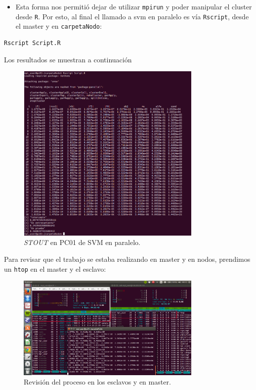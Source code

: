 \documentclass[]{article}
\begin{document}
\begin{itemize}
\itemsep1pt\parskip0pt
\item
  Esta forma nos permitió dejar de utilizar \texttt{mpirun} y poder
  manipular el cluster desde \texttt{R}. Por esto, al final el llamado a
  svm en paralelo es vía \texttt{Rscript}, desde el master y en
  \texttt{carpetaNodo}:
\end{itemize}

\begin{verbatim}
Rscript Script.R
\end{verbatim}

Los resultados se muestran a continuación

\begin{figure}[H]
\centering
\includegraphics[width=0.8\textwidth]{img/svm_paralelo_bien.png}
\caption{\emph{STOUT} en PC01 de SVM en paralelo.}

\end{figure}

Para revisar que el trabajo se estaba realizando en master y en nodos,
prendimos un \texttt{htop} en el master y el esclavo:

\begin{figure}[H]
\centering
\includegraphics[width=0.8\textwidth]{img/paralelo.png}
\caption{Revisión del proceso en los esclavos y en master.}

\end{figure}
\end{document}
